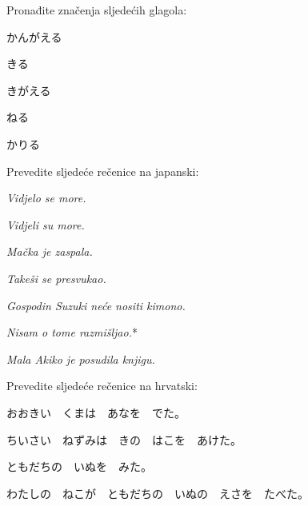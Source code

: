 
\author{Tomislav Mamić}

	
	\begin{mondai}{Pronađite značenja sljedećih glagola:}
		\item かんがえる
		\item きる
		\item きがえる
		\item ねる
		\item かりる
	\end{mondai}

	\begin{mondai}{Prevedite sljedeće rečenice na japanski:}
		\item \textit{Vidjelo se more.}
		\item \textit{Vidjeli su more.}
		\item \textit{Mačka je zaspala.}
		\item \textit{Takeši se presvukao.}
		\item \textit{Gospodin Suzuki neće nositi kimono.}
		\item \textit{Nisam o tome razmišljao.}*
		\item \textit{Mala Akiko je posudila knjigu.}
	\end{mondai}

	\begin{mondai}{Prevedite sljedeće rečenice na hrvatski:}
		\item おおきい　くまは　あなを　でた。
		\item ちいさい　ねずみは　きの　はこを　あけた。
		\item ともだちの　いぬを　みた。
		\item わたしの　ねこが　ともだちの　いぬの　えさを　たべた。
	\end{mondai}
